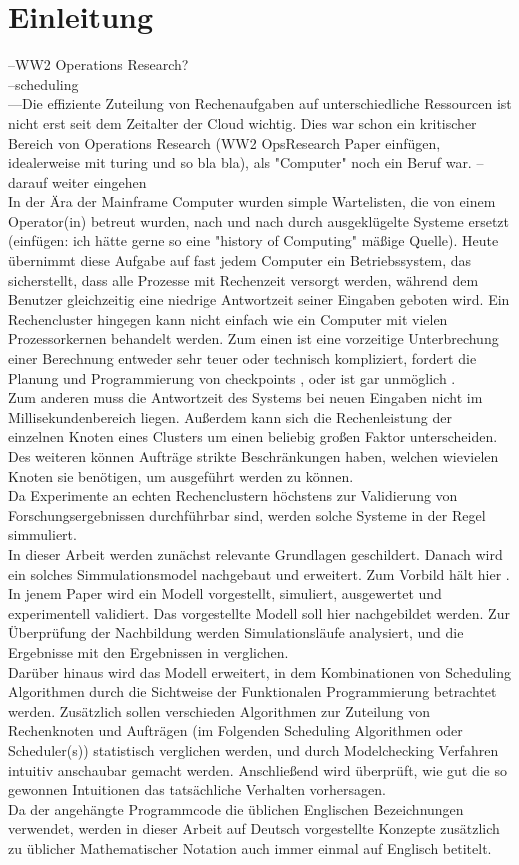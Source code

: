 \chapter{Einleitung}
\label{chap:ein}


--WW2 Operations Research?\\
--scheduling\\
---Die effiziente Zuteilung von Rechenaufgaben auf unterschiedliche Ressourcen ist nicht erst seit dem Zeitalter der Cloud wichtig. Dies war schon ein kritischer Bereich von Operations Research (WW2 OpsResearch Paper einfügen, idealerweise mit turing und so bla bla), als "Computer" noch ein Beruf war.
--darauf weiter eingehen\\

In der Ära der Mainframe Computer wurden simple Wartelisten, die von einem Operator(in) betreut wurden, nach und nach durch ausgeklügelte Systeme ersetzt (einfügen: ich hätte gerne so eine "history of Computing" mäßige Quelle). Heute übernimmt diese Aufgabe auf fast jedem Computer ein Betriebssystem, das sicherstellt, dass alle Prozesse mit Rechenzeit versorgt werden, während dem Benutzer gleichzeitig eine niedrige Antwortzeit seiner Eingaben geboten wird. Ein Rechencluster hingegen kann nicht einfach wie ein Computer mit vielen Prozessorkernen behandelt werden. Zum einen ist eine vorzeitige Unterbrechung einer Berechnung entweder sehr teuer oder technisch kompliziert, fordert die Planung und Programmierung von checkpoints \cite{IPS15}, oder ist gar unmöglich \cite{adams1979hitchhiker}.\\
Zum anderen muss die Antwortzeit des Systems bei neuen Eingaben nicht im Millisekundenbereich liegen. Außerdem kann sich die Rechenleistung der einzelnen Knoten eines Clusters um einen beliebig großen Faktor unterscheiden.  Des weiteren können Aufträge strikte Beschränkungen haben, welchen wievielen Knoten sie benötigen, um ausgeführt werden zu können.\\
Da Experimente an echten Rechenclustern höchstens zur Validierung von Forschungsergebnissen durchführbar sind, werden solche Systeme in der Regel simmuliert.\\
In dieser Arbeit werden zunächst relevante Grundlagen geschildert.
Danach wird ein solches Simmulationsmodel nachgebaut und erweitert. Zum Vorbild hält hier \cite{Arn99}. In jenem Paper wird ein Modell vorgestellt, simuliert, ausgewertet und experimentell validiert. Das vorgestellte Modell soll hier nachgebildet werden. Zur Überprüfung der Nachbildung werden Simulationsläufe analysiert, und die Ergebnisse mit den Ergebnissen in \cite{Arn99} verglichen.\\
Darüber hinaus wird das Modell erweitert, in dem Kombinationen von Scheduling Algorithmen durch die Sichtweise der Funktionalen Programmierung betrachtet werden.
Zusätzlich sollen verschieden Algorithmen zur Zuteilung von Rechenknoten und Aufträgen (im Folgenden Scheduling Algorithmen oder Scheduler(s)) statistisch verglichen werden, und durch Modelchecking Verfahren intuitiv anschaubar gemacht werden. Anschließend wird überprüft, wie gut die so gewonnen Intuitionen das tatsächliche Verhalten vorhersagen.\\


Da der angehängte Programmcode die üblichen Englischen Bezeichnungen verwendet, werden in dieser Arbeit auf Deutsch vorgestellte Konzepte zusätzlich zu üblicher Mathematischer Notation auch immer einmal auf Englisch betitelt.


